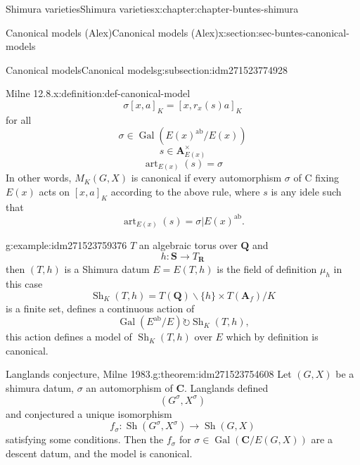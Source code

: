 \documentclass[oneside,10pt,]{book}
\numberwithin{equation}{section}
\newcommand{\lb}{[}
\newcommand{\rb}{]}
\newcommand{\QQ}{\mathbf{Q}}
\newcommand{\RR}{\mathbf{R}}
\newcommand{\CC}{\mathbf{C}}
\newcommand{\adeles}{\mathbf{A}}
\newcommand{\acts}{\circlearrowright}
\newcommand{\ab}{\mathrm{ab}}
\newcommand{\Gal}[2]{\operatorname{Gal}(#1/#2)}
\begin{document}
\begin{chapterptx}{Shimura varieties}{}{Shimura varieties}{}{}{x:chapter:chapter-buntes-shimura}
\begin{sectionptx}{Canonical models (Alex)}{}{Canonical models (Alex)}{}{}{x:section:sec-buntes-canonical-models}
\begin{subsectionptx}{Canonical models}{}{Canonical models}{}{}{g:subsection:idm271523774928}
\begin{definition}{Milne 12.8.}{x:definition:def-canonical-model}
\begin{equation*}
\sigma [x,a]_K = [x, r_x(s) a]_K
\end{equation*}
for all%
\begin{equation*}
\sigma \in \Gal{E(x)^\ab}{E(x)}
\end{equation*}
%
\begin{equation*}
s\in \adeles^\times_{E(x)}
\end{equation*}
%
\begin{equation*}
{\operatorname{art}}_{E(x)}(s) = \sigma
\end{equation*}
In other words, \(M_K(G,X)\) is canonical if every automorphism \(\sigma\) of C fixing \(E(x)\) acts on \(\lb x,a\rb_K\) according to the above rule, where \(s\) is any idele such that%
\begin{equation*}
{\operatorname{art}}_{E(x)}(s) = \sigma| E(x)^{\ab}\text{.}
\end{equation*}
%
\end{definition}
\begin{example}{}{g:example:idm271523759376}%
\(T \) an algebraic torus over \(\QQ\) and%
\begin{equation*}
h \colon \mathbf S \to T_\RR
\end{equation*}
then  \((T,h)\) is a Shimura datum \(E = E(T,h)\) is the field of definition \(\mu_h\) in this case%
\begin{equation*}
{\operatorname{Sh}}_K(T,h) = T(\QQ) \backslash \{h\}  \times T(\adeles_f) / K
\end{equation*}
is a finite set, defines a continuous action of%
\begin{equation*}
\Gal{E^\ab}{E} \acts {\operatorname{Sh}}_K(T,h)\text{,}
\end{equation*}
this action defines a model of \({\operatorname{Sh}}_K(T, h)\) over \(E\) which by definition is canonical.%
\end{example}
\begin{theorem}{Langlands conjecture, Milne 1983.}{}{g:theorem:idm271523754608}%
Let \((G,X)\) be a shimura datum, \(\sigma\) an automorphism of \(\CC\). Langlands defined%
\begin{equation*}
(G^\sigma, X^\sigma)
\end{equation*}
and conjectured a unique isomorphism%
\begin{equation*}
f_\sigma \colon {\operatorname{Sh}}(G^\sigma, X^\sigma) \to {\operatorname{Sh}}(G,X)
\end{equation*}
satisfying some conditions. Then the \(f_\sigma\) for \(\sigma\in \Gal{\CC}{E(G,X)}\) are a descent datum, and the model is canonical.%

\end{theorem}
\end{subsectionptx}
\end{sectionptx}
\end{chapterptx}
\end{document}
